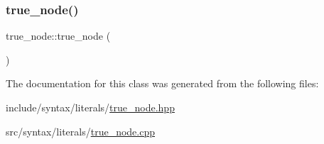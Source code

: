 \subsubsection{\texorpdfstring{true\+\_\+node()}{true\_node()}}
{\footnotesize\ttfamily true\+\_\+node\+::true\+\_\+node (\begin{DoxyParamCaption}{ }\end{DoxyParamCaption})}



The documentation for this class was generated from the following files\+:\begin{DoxyCompactItemize}
\item 
include/syntax/literals/\hyperlink{true__node_8hpp}{true\+\_\+node.\+hpp}\item 
src/syntax/literals/\hyperlink{true__node_8cpp}{true\+\_\+node.\+cpp}\end{DoxyCompactItemize}
